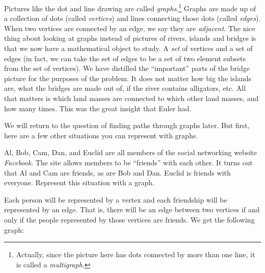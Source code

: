 \documentclass[12pt]{article}
\begin{document}
Pictures like the dot and line drawing are called {\em graphs}.\footnote{Actually, since the picture here has dots connected by more than one line, it is called a \emph{multigraph}.}  Graphs are made up of a collection of dots (called {\em vertices}) and lines connecting those dots (called \emph{edges}).  When two vertices are connected by an edge, we say they are \emph{adjacent}.  The nice thing about looking at graphs instead of pictures of rivers, islands and bridges is that we now have a mathematical object to study.  A {\em set} of vertices and a set of edges (in fact, we can take the set of edges to be a set of two element subsets from the set of vertices).  We have distilled the ``important'' parts of the bridge picture for the purposes of the problem.  It does not matter how big the islands are, what the bridges are made out of, if the river contains alligators, etc.  All that matters is which land masses are connected to which other land masses, and how many times.  This was the great insight that Euler had.

We will return to the question of finding paths through graphs later.  But first, here are a few other situations you can represent with graphs.

\begin{example}
  Al, Bob, Cam, Dan, and Euclid are all members of the social networking website {\em Facebook}.  The site allows members to be ``friends'' with each other.  It turns out that Al and Cam are friends, as are Bob and Dan.  Euclid is friends with everyone.  Represent this situation with a graph.
  \begin{solution}
    Each person will be represented by a vertex and each friendship will be represented by an edge.  That is, there will be an edge between two vertices if and only if the people represented by those vertices are friends.  We get the following graph:
    
    \begin{center}
    \end{center}
  \end{solution}

\end{example}
\end{document}
